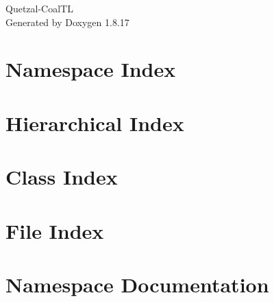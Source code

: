 \let\mypdfximage\pdfximage\def\pdfximage{\immediate\mypdfximage}\documentclass[twoside]{book}
\newcommand{\+}{\discretionary{\mbox{\scriptsize$\hookleftarrow$}}{}{}}
\newcommand{\clearemptydoublepage}{%
  \newpage{\pagestyle{empty}\cleardoublepage}%
}
\begin{document}
\hypersetup{pageanchor=false,
             bookmarksnumbered=true,
             pdfencoding=unicode
            }
\begin{titlepage}
\vspace*{7cm}
\begin{center}%
{\Large Quetzal-\/\+Coal\+TL }\\
\vspace*{1cm}
{\large Generated by Doxygen 1.8.17}\\
\end{center}
\end{titlepage}
\clearemptydoublepage
{}
\tableofcontents
\clearemptydoublepage
{}
\hypersetup{pageanchor=true}

\chapter{Namespace Index}

\chapter{Hierarchical Index}

\chapter{Class Index}

\chapter{File Index}

\chapter{Namespace Documentation}



\end{document}

